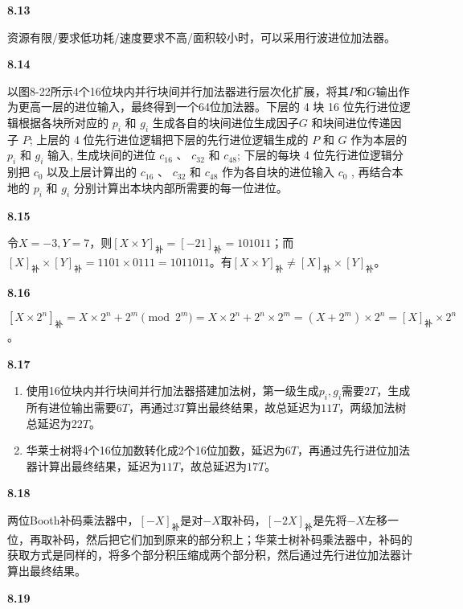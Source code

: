 \documentclass[UTF8]{report}
\begin{document}
\noindent
\textbf{8.13}

资源有限/要求低功耗/速度要求不高/面积较小时，可以采用行波进位加法器。

\noindent
\textbf{8.14}

以图8-22所示4个16位块内并行块间并行加法器进行层次化扩展，将其$P$和$G$输出作为更高一层的进位输入，最终得到一个64位加法器。下层的 4 块 16 位先行进位逻辑根据各块所对应的 $p_i$ 和 $g_i$ 生成各自的块间进位生成因子$G$ 和块间进位传递因子 $P$; 上层的 4 位先行进位逻辑把下层的先行进位逻辑生成的 $P$ 和 $G$ 作为本层的 $p_i$ 和 $g_i$ 输入, 生成块间的进位 $c_{16}$ 、 $c_{32}$ 和 $c_{48}$; 下层的每块 4 位先行进位逻辑分别把 $c_0$ 以及上层计算出的 $c_{16}$ 、 $c_{32}$ 和 $c_{48}$ 作为各自块的进位输入 $c_0$ , 再结合本地的 $p_i$ 和 $g_i$ 分别计算出本块内部所需要的每一位进位。

\noindent
\textbf{8.15}

令$X = -3, Y = 7$，则$[X \times Y]_{\text{补}} = [-21]_{\text{补}} = 101011$；而$[X]_{\text{补}} \times [Y]_{\text{补}} = 1101 \times 0111 = 1011011$。有$[X \times Y]_{\text{补}} \neq [X]_{\text{补}} \times [Y]_{\text{补}}$。

\noindent
\textbf{8.16}

$[X \times 2^n]_{\text{补}} = X \times 2^n + 2^m \pmod {2^m} = X \times 2^n + 2^n \times 2^m = (X + 2^m) \times 2^n = [X]_{\text{补}} \times 2^n$。

\noindent
\textbf{8.17}

\begin{enumerate}[label=(\arabic*)]
    \item 使用16位块内并行块间并行加法器搭建加法树，第一级生成$p_i, g_i$需要$2T$，生成所有进位输出需要$6T$，再通过$3T$算出最终结果，故总延迟为$11T$，两级加法树总延迟为$22T$。
    \item 华莱士树将4个16位加数转化成2个16位加数，延迟为$6T$，再通过先行进位加法器计算出最终结果，延迟为$11T$，故总延迟为$17T$。
\end{enumerate}

\noindent
\textbf{8.18}

两位Booth补码乘法器中，$[-X]_{\text{补}}$是对$-X$取补码，$[-2X]_{\text{补}}$是先将$-X$左移一位，再取补码，然后把它们加到原来的部分积上；华莱士树补码乘法器中，补码的获取方式是同样的，将多个部分积压缩成两个部分积，然后通过先行进位加法器计算出最终结果。

\noindent
\textbf{8.19}
\end{document}
